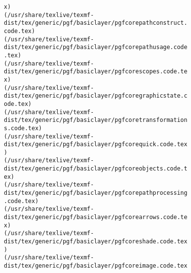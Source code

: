 \documentclass[11pt]{article}
\begin{document}
\begin{Verbatim}[commandchars=\\\{\}]
x)
(/usr/share/texlive/texmf-dist/tex/generic/pgf/basiclayer/pgfcorepathconstruct.
code.tex)
(/usr/share/texlive/texmf-dist/tex/generic/pgf/basiclayer/pgfcorepathusage.code
.tex)
(/usr/share/texlive/texmf-dist/tex/generic/pgf/basiclayer/pgfcorescopes.code.te
x)
(/usr/share/texlive/texmf-dist/tex/generic/pgf/basiclayer/pgfcoregraphicstate.c
ode.tex)
(/usr/share/texlive/texmf-dist/tex/generic/pgf/basiclayer/pgfcoretransformation
s.code.tex)
(/usr/share/texlive/texmf-dist/tex/generic/pgf/basiclayer/pgfcorequick.code.tex
)
(/usr/share/texlive/texmf-dist/tex/generic/pgf/basiclayer/pgfcoreobjects.code.t
ex)
(/usr/share/texlive/texmf-dist/tex/generic/pgf/basiclayer/pgfcorepathprocessing
.code.tex)
(/usr/share/texlive/texmf-dist/tex/generic/pgf/basiclayer/pgfcorearrows.code.te
x)
(/usr/share/texlive/texmf-dist/tex/generic/pgf/basiclayer/pgfcoreshade.code.tex
)
(/usr/share/texlive/texmf-dist/tex/generic/pgf/basiclayer/pgfcoreimage.code.tex


\end{Verbatim}
\end{document}
